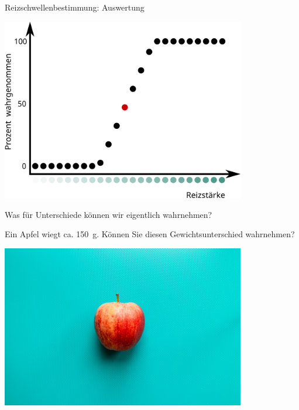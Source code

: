 \documentclass{beamer}
\begin{document}



\begin{frame}{Reizschwellenbestimmung: Auswertung}

\begin{center}
    \includegraphics[width=0.8\textwidth]{reizschwellen_diagramm.png}
\end{center}

\end{frame}




\begin{frame}{Was für Unterschiede können wir eigentlich wahrnehmen?}

Ein Apfel wiegt ca. \SI{150}{\gram}. Können Sie diesen Gewichtsunterschied wahrnehmen? 


\begin{center}
    \includegraphics[width=0.8\textwidth]{louis-hansel-MardkT836BU-unsplash.jpg}
    
\end{center}

    
\end{frame}
\end{document}
